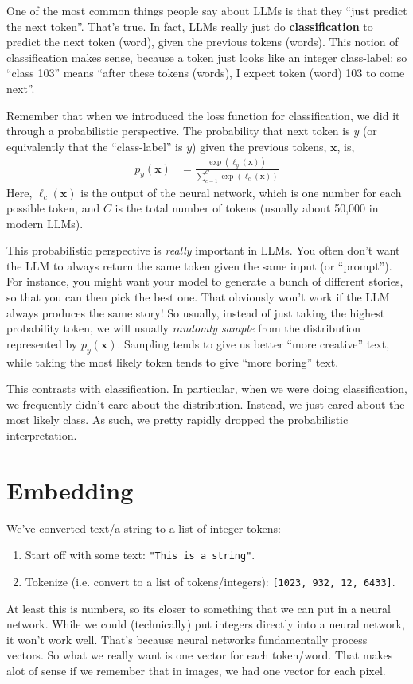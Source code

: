 \documentclass{article}
\newcommand{\x}{\mathbf{x}}
\newcommand{\logits}{\ell}
\newcommand{\bracket}[3]{\left#1 #3 \right#2}
\renewcommand{\b}{\bracket{(}{)}}
\begin{document}
One of the most common things people say about LLMs is that they ``just predict the next token''.
That's true.
In fact, LLMs really just do \textbf{classification} to predict the next token (word), given the previous tokens (words).
This notion of classification makes sense, because a token just looks like an integer class-label; so ``class 103'' means ``after these tokens (words), I expect token (word) 103 to come next''.

Remember that when we introduced the loss function for classification, we did it through a probabilistic perspective.
The probability that next token is $y$ (or equivalently that the ``class-label'' is $y$) given the previous tokens, $\x$, is,
\begin{align}
  p_y(\x) &= \frac{\exp\b{\logits_y(\x)}}{\sum_{c=1}^C \exp\b{\logits_c(\x)}}
\end{align}
Here, $\logits_c(\x)$ is the output of the neural network, which is one number for each possible token, and $C$ is the total number of tokens (usually about 50,000 in modern LLMs).

This probabilistic perspective is \textit{really} important in LLMs.
You often don't want the LLM to always return the same token given the same input (or ``prompt'').
For instance, you might want your model to generate a bunch of different stories, so that you can then pick the best one.
That obviously won't work if the LLM always produces the same story!
So usually, instead of just taking the highest probability token, we will usually \textit{randomly sample} from the distribution represented by $p_y(\x)$.
Sampling tends to give us better ``more creative'' text, while taking the most likely token tends to give ``more boring'' text.

This contrasts with classification.  In particular, when we were doing classification, we frequently didn't care about the distribution.
Instead, we just cared about the most likely class.
As such, we pretty rapidly dropped the probabilistic interpretation.

\section{Embedding}

We've converted text/a string to a list of integer tokens:
\begin{enumerate}
  \item Start off with some text: \verb|"This is a string"|.
  \item Tokenize (i.e. convert to a list of tokens/integers): \verb|[1023, 932, 12, 6433]|.
\end{enumerate}
At least this is numbers, so its closer to something that we can put in a neural network.
While we could (technically) put integers directly into a neural network, it won't work well.
That's because neural networks fundamentally process vectors.
So what we really want is one vector for each token/word.
That makes alot of sense if we remember that in images, we had one vector for each pixel.
\end{document}

